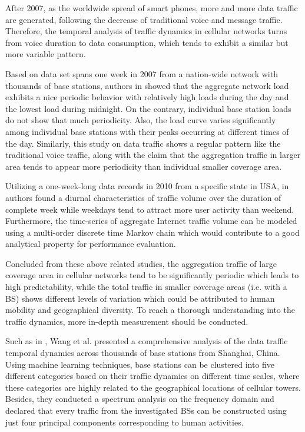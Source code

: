{After 2007, as the worldwide spread of smart phones, more and more data traffic are generated, following the decrease of traditional voice and message traffic. Therefore, the temporal analysis of traffic dynamics in cellular networks turns from voice duration to data consumption, which tends to exhibit a similar but more variable pattern.

Based on data set spans one week in 2007 from a nation-wide network with thousands of base stations, authors in \cite{paul2011understanding} showed that the aggregate network load exhibits a nice periodic behavior with relatively high loads during the day and the lowest load during midnight. On the contrary, individual base station loads do not show that much periodicity. Also, the load curve varies significantly among individual base stations with their peaks occurring at different times of the day. Similarly, this study on data traffic shows a regular pattern like the traditional voice traffic, along with the claim that the aggregation traffic in larger area tends to appear more periodicity than individual smaller coverage area.

Utilizing a one-week-long data records in 2010 from a specific state in USA, in \cite{shafiq2011characterizing} authors found a diurnal characteristics of traffic volume over the duration of complete week while weekdays tend to attract more user activity than weekend. Furthermore, the time-series of aggregate Internet traffic volume can be modeled using a multi-order discrete time Markov chain which would contribute to a good analytical property for performance evaluation.

Concluded from these above related studies, the aggregation traffic of large coverage area in cellular networks tend to be significantly periodic which leads to high predictability, while the total traffic in smaller coverage areas (i.e. with a BS) shows different levels of variation which could be attributed to human mobility and geographical diversity. To reach a thorough understanding into the traffic dynamics, more in-depth measurement should be conducted.

Such as in \cite{wang2015understanding}, Wang et al. presented a comprehensive analysis of the data traffic temporal dynamics across thousands of base stations from Shanghai, China. Using machine learning techniques, base stations can be clustered into five different categories based on their traffic dynamics on different time scales, where these categories are highly related to the geographical locations of cellular towers. Besides, they conducted a spectrum analysis on the frequency domain and declared that every traffic from the investigated BSs can be constructed using just four principal components corresponding to human activities.

}

